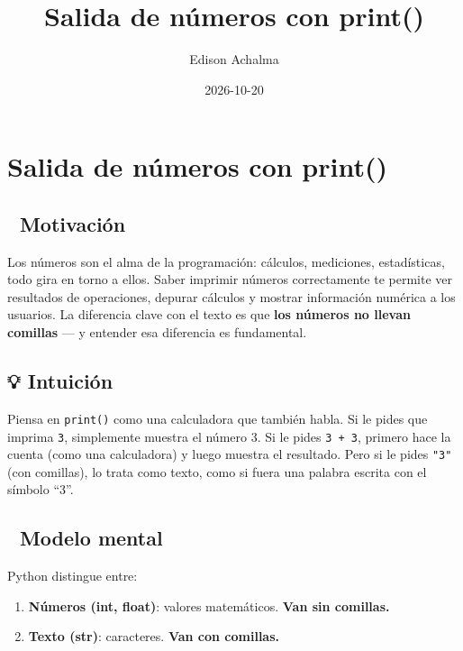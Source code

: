 \documentclass[
  doc,
  floatsintext,
  longtable,
  a4paper,
  nolmodern,
  notxfonts,
  notimes,
  12pt,
  colorlinks=true,linkcolor=blue,citecolor=blue,urlcolor=blue]{apa7}
\title{Salida de números con print()}
\author{Edison Achalma}
\affiliation{
{Escuela Profesional de Economía, Universidad Nacional de San Cristóbal
de Huamanga}}
\date{2026-10-20}
\providecommand{\tightlist}{%
  \setlength{\itemsep}{0pt}\setlength{\parskip}{0pt}}
\begin{document}
\maketitle


\hypertarget{toc}{}
\tableofcontents
\newpage
\section[Introduction]{Salida de números con print()}

\setcounter{secnumdepth}{3}

\setlength\LTleft{0pt}




\subsection{🎯 Motivación}\label{motivaciuxf3n}

Los números son el alma de la programación: cálculos, mediciones,
estadísticas, todo gira en torno a ellos. Saber imprimir números
correctamente te permite ver resultados de operaciones, depurar cálculos
y mostrar información numérica a los usuarios. La diferencia clave con
el texto es que \textbf{los números no llevan comillas} --- y entender
esa diferencia es fundamental.

\subsection{💡 Intuición}\label{intuiciuxf3n}

Piensa en \texttt{print()} como una calculadora que también habla. Si le
pides que imprima \texttt{3}, simplemente muestra el número 3. Si le
pides \texttt{3\ +\ 3}, primero hace la cuenta (como una calculadora) y
luego muestra el resultado. Pero si le pides \texttt{"3"} (con
comillas), lo trata como texto, como si fuera una palabra escrita con el
símbolo ``3''.

\subsection{🧠 Modelo mental}\label{modelo-mental}

Python distingue entre:

\begin{enumerate}
\def\labelenumi{\arabic{enumi}.}
\tightlist
\item
  \textbf{Números (int, float)}: valores matemáticos. \textbf{Van sin
  comillas.}
\item
  \textbf{Texto (str)}: caracteres. \textbf{Van con comillas.}
\end{enumerate}
\end{document}

